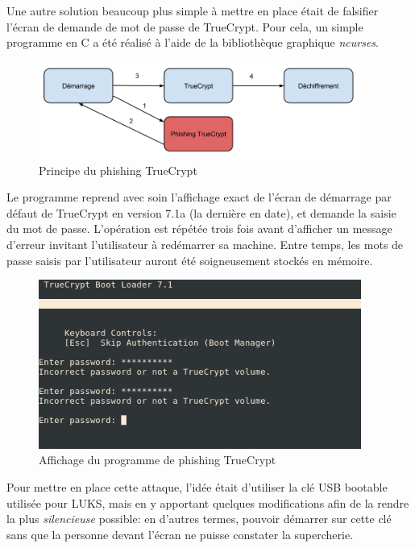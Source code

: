 \documentclass[12pt,a4paper]{article}
\begin{document}
Une autre solution beaucoup plus simple à mettre en place était de falsifier l'écran de demande de mot de passe de TrueCrypt. Pour cela, un simple programme en C a été réalisé à l'aide de la bibliothèque graphique \textit{ncurses}.

\begin{figure}[H]
	\centering
	\includegraphics[width=400px]{img/truecrypt_phishing.png}
	\caption{Principe du phishing TrueCrypt}
\end{figure}

Le programme reprend avec soin l'affichage exact de l'écran de démarrage par défaut de TrueCrypt en version 7.1a (la dernière en date), et demande la saisie du mot de passe. L'opération est répétée trois fois avant d'afficher un message d'erreur invitant l'utilisateur à redémarrer sa machine. Entre temps, les mots de passe saisis par l'utilisateur auront été soigneusement stockés en mémoire.

\begin{figure}[H]
	\centering
	\includegraphics[width=400px]{img/truecrypt_ncurses.png}
	\caption{Affichage du programme de phishing TrueCrypt}
\end{figure}

Pour mettre en place cette attaque, l'idée était d'utiliser la clé USB bootable utilisée pour LUKS, mais en y apportant quelques modifications afin de la rendre la plus \textit{silencieuse} possible: en d'autres termes, pouvoir démarrer sur cette clé sans que la personne devant l'écran ne puisse constater la supercherie.
\end{document}
